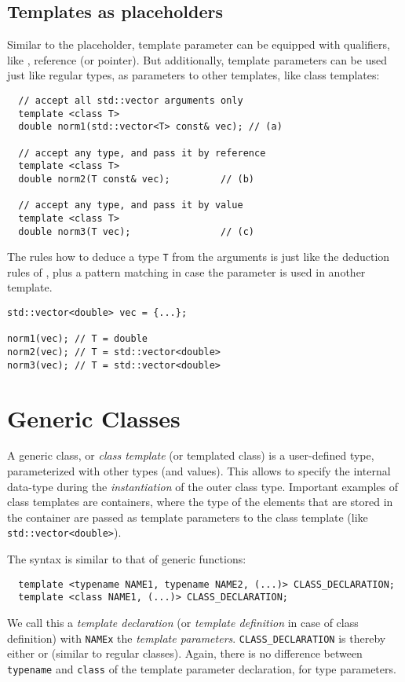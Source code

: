 \subsection{Templates as placeholders}
Similar to the  placeholder, template parameter can be equipped with qualifiers, like , reference (or pointer).
But additionally, template parameters can be used just like regular types, as parameters to other templates, like class templates:
%
\begin{verbatim}
  // accept all std::vector arguments only
  template <class T>
  double norm1(std::vector<T> const& vec); // (a)

  // accept any type, and pass it by reference
  template <class T>
  double norm2(T const& vec);         // (b)

  // accept any type, and pass it by value
  template <class T>
  double norm3(T vec);                // (c)
\end{verbatim}
%
The rules how to deduce a type \texttt{T} from the arguments is just like the deduction rules of , plus a pattern matching
in case the parameter is used in another template.
%
\begin{verbatim}
std::vector<double> vec = {...};

norm1(vec); // T = double
norm2(vec); // T = std::vector<double>
norm3(vec); // T = std::vector<double>
\end{verbatim}


\section{Generic Classes}
A generic class, or \emph{class template} (or templated class) is a user-defined type, parameterized with other types (and values). This
allows to specify the internal data-type during the \emph{instantiation} of the outer class type. Important examples of class templates
are containers, where the type of the elements that are stored in the container are passed as template parameters to the class template
(like \texttt{std::vector<double>}).

The syntax is similar to that of generic functions:
\begin{verbatim}
  template <typename NAME1, typename NAME2, (...)> CLASS_DECLARATION;
  template <class NAME1, (...)> CLASS_DECLARATION;
\end{verbatim}
We call this a \emph{template declaration} (or \emph{template definition} in case of class definition) with \texttt{NAMEx} the \emph{template parameters}.
\texttt{CLASS\_DECLARATION} is thereby either  or  (similar to regular classes).
Again, there is no difference between \texttt{typename} and \texttt{class} of the template parameter declaration, for type parameters.

